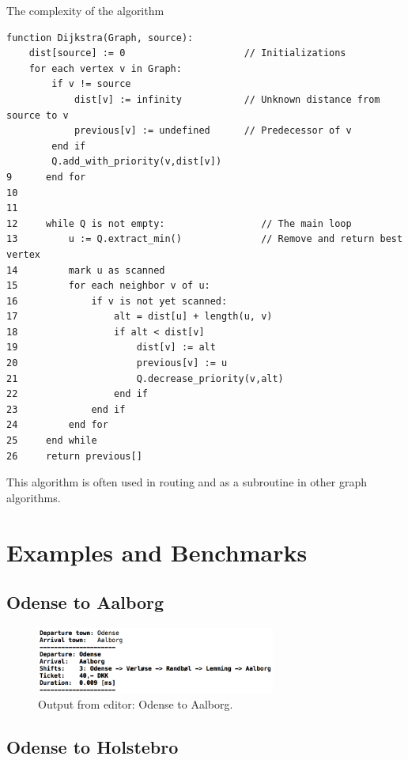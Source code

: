 The complexity of the algorithm 


\begin{lstlisting}
function Dijkstra(Graph, source):
    dist[source] := 0                     // Initializations
    for each vertex v in Graph:           
        if v != source
            dist[v] := infinity           // Unknown distance from source to v
            previous[v] := undefined      // Predecessor of v
        end if
        Q.add_with_priority(v,dist[v])
9      end for 
10
11
12     while Q is not empty:                 // The main loop
13         u := Q.extract_min()              // Remove and return best vertex
14         mark u as scanned
15         for each neighbor v of u:
16             if v is not yet scanned:
17                 alt = dist[u] + length(u, v) 
18                 if alt < dist[v]
19                     dist[v] := alt
20                     previous[v] := u
21                     Q.decrease_priority(v,alt)
22                 end if
23             end if
24         end for
25     end while
26     return previous[]

\end{lstlisting}



This algorithm is often used in routing and as a subroutine in other graph algorithms.


\section{Examples and Benchmarks}



\subsection{Odense to Aalborg}

\begin{figure}[th!]
\centering
\includegraphics[width=0.7\textwidth]{./graphics/ex1}
\caption{Output from editor: Odense to Aalborg.}
\label{fig:odense_Aalborg}
\end{figure}

	
\subsection{Odense to Holstebro}

